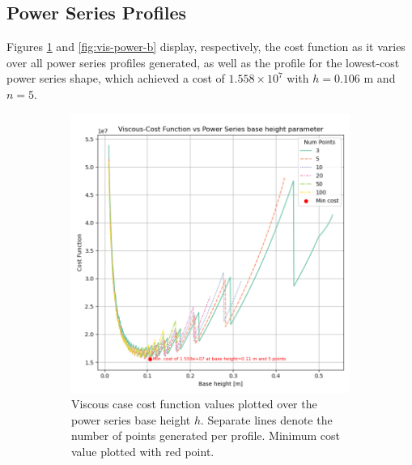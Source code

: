\documentclass[11pt]{article}
\begin{document}
\subsection{Power Series Profiles}
Figures \ref{fig:vis-power-a} and \ref{fig:vis-power-b} display, respectively, the cost function as it varies over all power series profiles generated, as well as the profile for the lowest-cost power series shape, which achieved a cost of $1.558 \times 10^7$ with $h=0.106 \text{ m}$ and $n=5$.
\begin{figure}[H]
\centering
\begin{subfigure}[b]{0.45\textwidth}
    \centering
    \includegraphics[width=\linewidth]{../results/viscous/power_series.png}
    \caption{Viscous case cost function values plotted over the power series base height $h$. Separate lines denote the number of points generated per profile. Minimum cost value plotted with red point.}
    \label{fig:vis-power-a}
\end{subfigure}
\hfill
\begin{subfigure}[b]{0.45\textwidth}
    \centering

\end{subfigure}
\end{figure}
\end{document}

